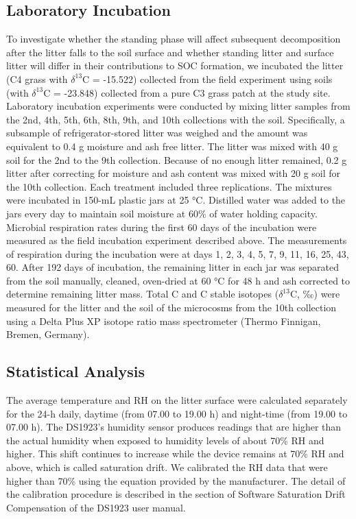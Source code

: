 \documentclass[
]{article}
\begin{document}
\subsection{Laboratory Incubation}\label{laboratory-incubation}

To investigate whether the standing phase will affect subsequent
decomposition after the litter falls to the soil surface and whether
standing litter and surface litter will differ in their contributions to
SOC formation, we incubated the litter (C4 grass with \(\delta^{13}\)C =
-15.522) collected from the field experiment using soils (with
\(\delta^{13}\)C = -23.848) collected from a pure C3 grass patch at the
study site. Laboratory incubation experiments were conducted by mixing
litter samples from the 2nd, 4th, 5th, 6th, 8th, 9th, and 10th
collections with the soil. Specifically, a subsample of
refrigerator-stored litter was weighed and the amount was equivalent to
0.4 g moisture and ash free litter. The litter was mixed with 40 g soil
for the 2nd to the 9th collection. Because of no enough litter remained,
0.2 g litter after correcting for moisture and ash content was mixed
with 20 g soil for the 10th collection. Each treatment included three
replications. The mixtures were incubated in 150-mL plastic jars at 25
°C. Distilled water was added to the jars every day to maintain soil
moisture at 60\% of water holding capacity. Microbial respiration rates
during the ﬁrst 60 days of the incubation were measured as the ﬁeld
incubation experiment described above. The measurements of respiration
during the incubation were at days 1, 2, 3, 4, 5, 7, 9, 11, 16, 25, 43,
60. After 192 days of incubation, the remaining litter in each jar was
separated from the soil manually, cleaned, oven-dried at 60 °C for 48 h
and ash corrected to determine remaining litter mass. Total C and C
stable isotopes (\(\delta^{13}\)C, ‰) were measured for the litter and
the soil of the microcosms from the 10th collection using a Delta Plus
XP isotope ratio mass spectrometer (Thermo Finnigan, Bremen, Germany).

\subsection{Statistical Analysis}\label{statistical-analysis}

The average temperature and RH on the litter surface were calculated
separately for the 24-h daily, daytime (from 07.00 to 19.00 h) and
night-time (from 19.00 to 07.00 h). The DS1923's humidity sensor
produces readings that are higher than the actual humidity when exposed
to humidity levels of about 70\% RH and higher. This shift continues to
increase while the device remains at 70\% RH and above, which is called
saturation drift. We calibrated the RH data that were higher than 70\%
using the equation provided by the manufacturer. The detail of the
calibration procedure is described in the section of Software Saturation
Drift Compensation of the DS1923 user manual.
\end{document}
